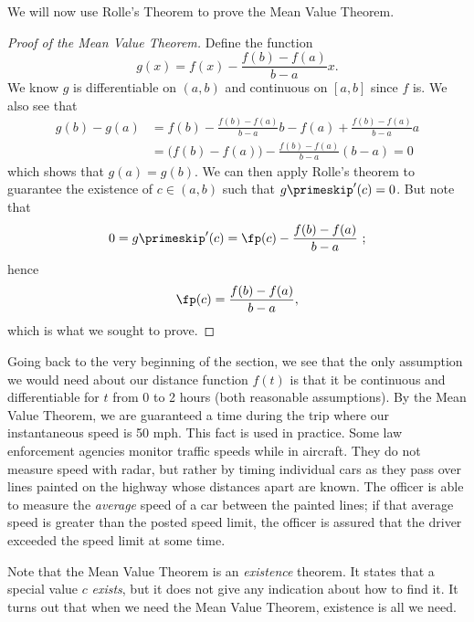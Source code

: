 We will now use Rolle's Theorem to prove the Mean Value Theorem.

\begin{proof}[Proof of the Mean Value Theorem]
Define the function $$g(x) = f(x) - \frac{f(b)-f(a)}{b-a}x.$$  We know $g$ is differentiable on $(a,b)$ and  continuous on $[a,b]$ since $f$ is.  We also see that
\begin{align*}
g(b)-g(a)&=f(b)-\frac{f(b)-f(a)}{b-a}b-f(a)+\frac{f(b)-f(a)}{b-a}a\\
&=\bigl(f(b)-f(a)\bigr)-\frac{f(b)-f(a)}{b-a}(b-a)=0
\end{align*}
which shows that $g(a)=g(b)$. We can then apply Rolle's theorem to guarantee the existence of $c \in (a,b)$ such that $g\primeskip'(c) = 0$.  But note that
$$0= g\primeskip'(c) = \fp(c) - \frac{f(b)-f(a)}{b-a} \ ;$$
hence
$$\fp(c) = \frac{f(b)-f(a)}{b-a},$$
which is what we sought to prove.
\end{proof}

Going back to the very beginning of the section, we see that the only assumption we would need about our distance function $f(t)$ is that it be continuous and differentiable for $t$ from 0 to 2 hours (both reasonable assumptions).  By the Mean Value Theorem, we are guaranteed a time during the trip where our instantaneous speed is 50 mph. This fact is used in practice. Some law enforcement agencies monitor traffic speeds while in aircraft. They do not measure speed with radar, but rather by timing individual cars as they pass over lines painted on the highway whose distances apart are known. The officer is able to measure the \textit{average} speed of a car between the painted lines; if that average speed is greater than the posted speed limit, the officer is assured that the driver exceeded the speed limit at some time.

Note that the Mean Value Theorem is an \textit{existence} theorem. It states that a special value $c$ \textit{exists}, but it does not give any indication about how to find it. It turns out that when we need the Mean Value Theorem, existence is all we need.\\


